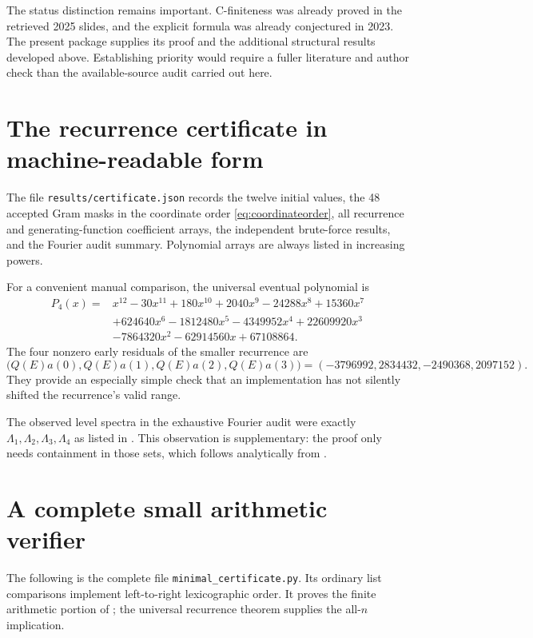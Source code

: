 \documentclass[11pt,letterpaper]{article}
\theoremstyle{definition}
\newcommand{\1}{\mathbf 1}
\begin{document}
The status distinction remains important. C-finiteness was already proved in
the retrieved 2025 slides, and the explicit formula was already conjectured in
2023. The present package supplies its proof and the additional structural
results developed above. Establishing priority would require a fuller
literature and author check than the available-source audit carried out here.

\appendix
\section{The recurrence certificate in machine-readable form}
\label{app:recurrences}
The file \texttt{results/certificate.json} records the twelve initial values,
the 48 accepted Gram masks in the coordinate order \eqref{eq:coordinateorder},
all recurrence and generating-function coefficient arrays, the independent
brute-force results, and the Fourier audit summary. Polynomial arrays are
always listed in increasing powers.

For a convenient manual comparison, the universal eventual polynomial is
\begin{align*}
 P_4(x)={}&x^{12}-30x^{11}+180x^{10}+2040x^9-24288x^8
                +15360x^7\\
          &+624640x^6-1812480x^5-4349952x^4+22609920x^3\\
          &-7864320x^2-62914560x+67108864.
\end{align*}
The four nonzero early residuals of the smaller recurrence are
\[
 \bigl(Q(E)a(0),Q(E)a(1),Q(E)a(2),Q(E)a(3)\bigr)
 =(-3796992,2834432,-2490368,2097152).
\]
They provide an especially simple check that an implementation has not silently
shifted the recurrence's valid range.

The observed level spectra in the exhaustive Fourier audit were exactly
$\Lambda_1,\Lambda_2,\Lambda_3,\Lambda_4$ as listed in
. This observation is supplementary: the proof only needs
containment in those sets, which follows analytically from
.

\clearpage
\section{A complete small arithmetic verifier}
\label{app:code}
The following is the complete file \texttt{minimal\_certificate.py}. Its
ordinary list comparisons implement left-to-right lexicographic order.
It proves the finite arithmetic portion of ; the universal
recurrence theorem supplies the all-$n$ implication.

\end{document}
